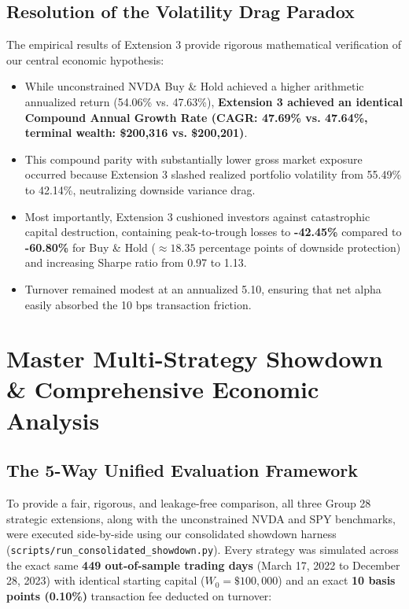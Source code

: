 \documentclass[12pt, a4paper]{article}
\begin{document}
\subsection{Resolution of the Volatility Drag Paradox}
The empirical results of Extension 3 provide rigorous mathematical verification of our central economic hypothesis:
\begin{itemize}
    \item While unconstrained NVDA Buy \& Hold achieved a higher arithmetic annualized return (54.06\% vs. 47.63\%), \textbf{Extension 3 achieved an identical Compound Annual Growth Rate (CAGR: 47.69\% vs. 47.64\%, terminal wealth: \$200,316 vs. \$200,201)}.
    \item This compound parity with substantially lower gross market exposure occurred because Extension 3 slashed realized portfolio volatility from 55.49\% to 42.14\%, neutralizing downside variance drag.
    \item Most importantly, Extension 3 cushioned investors against catastrophic capital destruction, containing peak-to-trough losses to \textbf{-42.45\%} compared to \textbf{-60.80\%} for Buy \& Hold ($\approx 18.35$ percentage points of downside protection) and increasing Sharpe ratio from 0.97 to 1.13.
    \item Turnover remained modest at an annualized 5.10, ensuring that net alpha easily absorbed the 10 bps transaction friction.
\end{itemize}


\section{Master Multi-Strategy Showdown \& Comprehensive Economic Analysis}
\subsection{The 5-Way Unified Evaluation Framework}
To provide a fair, rigorous, and leakage-free comparison, all three Group 28 strategic extensions, along with the unconstrained NVDA and SPY benchmarks, were executed side-by-side using our consolidated showdown harness (\texttt{scripts/run\_consolidated\_showdown.py}). Every strategy was simulated across the exact same \textbf{449 out-of-sample trading days} (March 17, 2022 to December 28, 2023) with identical starting capital ($W_0 = \$100,000$) and an exact \textbf{10 basis points (0.10\%)} transaction fee deducted on turnover:
\end{document}
